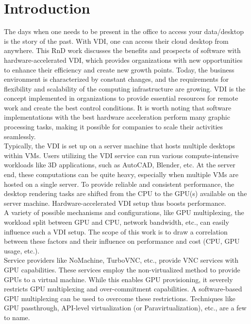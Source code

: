 \documentclass[a4paper,12pt, final]{report}
\begin{document}
\tableofcontents
{}
\listoffigures

\begingroup
\let\clearpage\relax
\listoftables
\endgroup

\chapter{Introduction}

The days when one needs to be present in the office to access your data/desktop is the story of the past. With VDI, one can access their cloud desktop from anywhere. This RnD work discusses the benefits and prospects of software with hardware-accelerated VDI, which provides organizations with new opportunities to enhance their efficiency and create new growth points. Today, the business environment is characterized by constant changes, and the requirements for flexibility and scalability of the computing infrastructure are growing. VDI is the concept implemented in organizations to provide essential resources for remote work and create the best control conditions. It is worth noting that software implementations with the best hardware acceleration perform many graphic processing tasks, making it possible for companies to scale their activities seamlessly.\\

\noindent Typically, the VDI is set up on a server machine that hosts multiple desktops within VMs. Users utilizing the VDI service can run various compute-intensive workloads like 3D applications, such as AutoCAD, Blender, etc. At the server end, these computations can be quite heavy, especially when multiple VMs are hosted on a single server. To provide reliable and consistent performance, the desktop rendering tasks are shifted from the CPU to the GPU(s) available on the server machine. Hardware-accelerated VDI setup thus boosts performance.\\

\noindent A variety of possible mechanisms and configurations, like GPU multiplexing, the workload split between GPU and CPU, network bandwidth, etc., can easily influence such a VDI setup. The scope of this work is to draw a correlation between these factors and their influence on performance and cost (CPU, GPU usage, etc.).\\

\noindent Service providers like NoMachine, TurboVNC, etc., provide VNC services with GPU capabilities. These services employ the non-virtualized method to provide GPUs to a virtual machine. While this enables GPU provisioning, it severely restricts GPU multiplexing and over-commitment capabilities. A software-based GPU multiplexing can be used to overcome these restrictions. Techniques like GPU passthrough, API-level virtualization (or Paravirtualization), etc., are a few to name.\\
\end{document}
